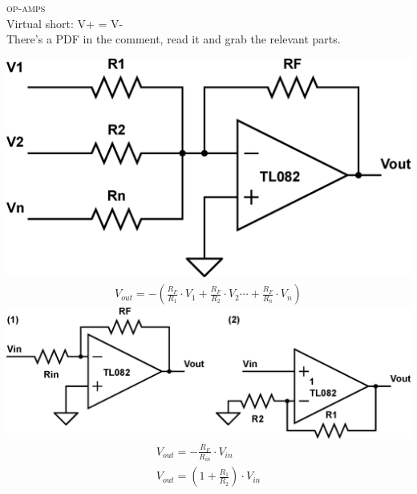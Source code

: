 \documentclass[10pt,letterpaper,english]{article}
\begin{document}
\textsc{op-amps}\\
Virtual short: V+ = V-\\
There's a PDF in the comment, read it and grab the relevant parts.

\begin{multicols}{2}
\includegraphics[scale=0.2]{opamp-1.eps}
\begin{align*}
V_{out} = -(\frac{R_F}{R_1}\cdot V_1 + \frac{R_F}{R_2}\cdot V_2 \cdots + \frac{R_F}{R_n}\cdot V_n)
\end{align*}
\includegraphics[scale=0.4]{opamp-2.eps}
\begin{align*}
V_{out} = -\frac{R_F}{R_{in}}\cdot V_{in} \tag*{(1) Inverting}\\
V_{out} = (1 + \frac{R_1}{R_2})\cdot V_{in} \tag*{(2) Non-inverting}\\
\end{align*}
\end{multicols}
\end{document}
